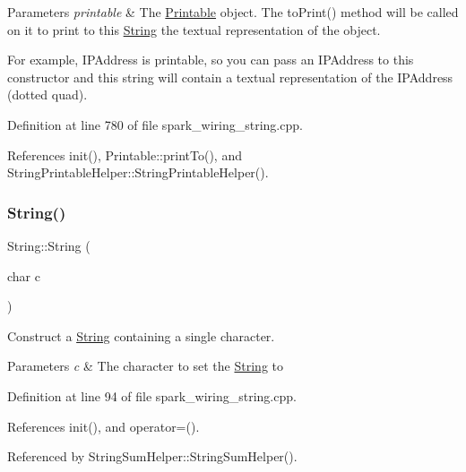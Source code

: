 \begin{DoxyParams}{Parameters}
{\em printable} & The \hyperlink{class_printable}{Printable} object. The to\+Print() method will be called on it to print to this \hyperlink{class_string}{String} the textual representation of the object.\\
\hline
\end{DoxyParams}
For example, I\+P\+Address is printable, so you can pass an I\+P\+Address to this constructor and this string will contain a textual representation of the I\+P\+Address (dotted quad). 

Definition at line 780 of file spark\+\_\+wiring\+\_\+string.\+cpp.



References init(), Printable\+::print\+To(), and String\+Printable\+Helper\+::\+String\+Printable\+Helper().

\mbox{\label{class_string_a1fdfe981d2c5e0075c1669dd94553082}} 
\subsubsection{\texorpdfstring{String()}{String()}\hspace{0.1cm}{\footnotesize\ttfamily [6/13]}}
{\footnotesize\ttfamily String\+::\+String (\begin{DoxyParamCaption}\item[{char}]{c }\end{DoxyParamCaption})\hspace{0.3cm}{\ttfamily [explicit]}}



Construct a \hyperlink{class_string}{String} containing a single character. 


\begin{DoxyParams}{Parameters}
{\em c} & The character to set the \hyperlink{class_string}{String} to \\
\hline
\end{DoxyParams}


Definition at line 94 of file spark\+\_\+wiring\+\_\+string.\+cpp.



References init(), and operator=().



Referenced by String\+Sum\+Helper\+::\+String\+Sum\+Helper().

\mbox{\label{class_string_adb05525482f5991815322239e5504539}} 
